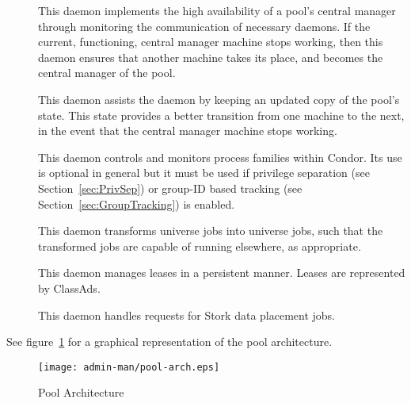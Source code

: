 \begin{description}
\item[] This daemon
implements the high availability of a pool's central manager
through monitoring the communication of necessary daemons.
If the current, functioning, central manager machine
stops working, then this daemon ensures that another 
machine takes its place, and becomes the central manager of
the pool.

\item[] This daemon
assists the  daemon by keeping an updated copy of the
pool's state. This state provides a better transition
from one machine to the next, in the event 
that the central manager machine stops working.

\item[] This daemon
controls and monitors process families within Condor. Its use
is optional in general but it must be used if privilege separation
(see Section~\ref{sec:PrivSep}) or group-ID based tracking (see
Section~\ref{sec:GroupTracking}) is enabled.

\item[] This daemon 
transforms  universe jobs into 
universe jobs, such that the transformed jobs are capable
of running elsewhere, as appropriate.

\item[] This daemon 
manages leases in a persistent manner.
Leases are represented by ClassAds.

\item[] This daemon
handles requests for Stork data placement jobs.

\end{description} 


See figure~\ref{fig:pool-arch} for a graphical representation of the
pool architecture. 

\begin{figure}[hbt]
\centering
\texttt{[image: admin-man/pool-arch.eps]}
\caption{\label{fig:pool-arch}Pool Architecture}
\end{figure}
